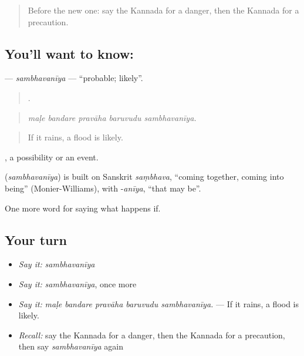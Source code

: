 \label{lesson:KA-C412-sambhavaniya}



\begin{quote}
Before the new one: say the Kannada for a danger, then the Kannada for a precaution.
\end{quote}

\subsection*{You'll want to know: }
\textbf{} — \emph{sambhavanīya} — \textquotedblleft{}probable; likely\textquotedblright{}.

\begin{quote}
    .
\end{quote}

\begin{quote}
\emph{maḷe bandare pravāha baruvudu sambhavanīya.}
\end{quote}

\begin{quote}
If it rains, a flood is likely.
\end{quote}

, a possibility or an event.

\begin{cousinweb}
\textbf{} (\emph{sambhavanīya}) is built on Sanskrit \emph{saṃbhava}, \textquotedblleft{}coming together, coming into being\textquotedblright{} (Monier-Williams), with -\emph{anīya}, \textquotedblleft{}that may be\textquotedblright{}.
\end{cousinweb}

\begin{grammarlens}[title={What you've built}]
One more word for saying what happens if.
\end{grammarlens}

\subsection*{Your turn}
\begin{itemize}
\raggedright
  \item \emph{Say it:} \emph{sambhavanīya}
  \item \emph{Say it:} \emph{sambhavanīya}, once more
  \item \emph{Say it:} \emph{maḷe bandare pravāha baruvudu sambhavanīya.} — If it rains, a flood is likely.
  \item \emph{Recall:} say the Kannada for a danger, then the Kannada for a precaution, then say \emph{sambhavanīya} again
\end{itemize}

